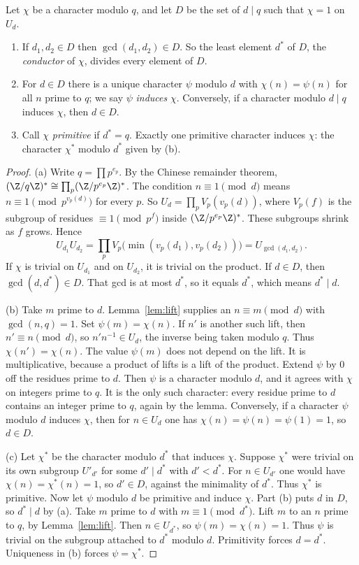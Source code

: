 \begin{proposition}\label{prop:conductor}
Let $\chi$ be a character modulo $q$, and let $D$ be the set of $d\mid q$ such that $\chi=1$ on $U_d$.
\begin{enumerate}[label=(\alph*)]
\item If $d_1,d_2\in D$ then $\gcd(d_1,d_2)\in D$. So the least element $d^*$ of $D$, the \emph{conductor} of $\chi$, divides every element of $D$.
\item For $d\in D$ there is a unique character $\psi$ modulo $d$ with $\chi(n)=\psi(n)$ for all $n$ prime to $q$; we say $\psi$ \emph{induces} $\chi$. Conversely,
if a character modulo $d\mid q$ induces $\chi$, then $d\in D$.
\item Call $\chi$ \emph{primitive} if $d^*=q$. Exactly one primitive character induces $\chi$: the character $\chi^*$ modulo $d^*$ given by (b).
\end{enumerate}
\end{proposition}
\begin{proof}
(a) Write $q=\prod p^{e_p}$. By the Chinese remainder theorem, $(\Z/q\Z)^*\cong\prod_p(\Z/p^{e_p}\Z)^*$. The condition $n\equiv1\pmod d$ means $n\equiv1\pmod{p^{v_p(d)}}$ for every $p$. So $U_d=\prod_p V_p(v_p(d))$, where $V_p(f)$ is the subgroup of residues $\equiv1\pmod{p^f}$ inside $(\Z/p^{e_p}\Z)^*$. These subgroups shrink as $f$ grows. Hence
\[
U_{d_1}U_{d_2}=\prod_p V_p\bigl(\min(v_p(d_1),v_p(d_2))\bigr)=U_{\gcd(d_1,d_2)}.
\]
If $\chi$ is trivial on $U_{d_1}$ and on $U_{d_2}$, it is trivial on the product. If $d\in D$, then $\gcd(d,d^*)\in D$. That gcd is at most $d^*$, so it equals $d^*$, which means $d^*\mid d$.

(b) Take $m$ prime to $d$. Lemma~\ref{lem:lift} supplies an $n\equiv m\pmod d$ with $\gcd(n,q)=1$. Set $\psi(m)=\chi(n)$. If $n'$ is another such lift, then $n'\equiv n\pmod d$, so $n'n^{-1}\in U_d$, the inverse being taken modulo $q$. Thus $\chi(n')=\chi(n)$. The value $\psi(m)$ does not depend on the lift. It is multiplicative, because a product of lifts is a lift of the product. Extend $\psi$ by $0$ off the residues prime to $d$. Then $\psi$ is a character modulo $d$, and it agrees with $\chi$ on integers prime to $q$. It is the only such character: every residue prime to $d$ contains an integer prime to $q$, again by the lemma. Conversely, if a character $\psi$ modulo $d$ induces $\chi$, then for $n\in U_d$ one has $\chi(n)=\psi(n)=\psi(1)=1$, so $d\in D$.

(c) Let $\chi^*$ be the character modulo $d^*$ that induces $\chi$. Suppose $\chi^*$ were trivial on its own subgroup $U'_{d'}$ for some $d'\mid d^*$ with $d'<d^*$. For $n\in U_{d'}$ one would have $\chi(n)=\chi^*(n)=1$, so $d'\in D$, against the minimality of $d^*$. Thus $\chi^*$ is primitive. Now let $\psi$ modulo $d$ be primitive and induce $\chi$. Part (b) puts $d$ in $D$, so $d^*\mid d$ by (a). Take $m$ prime to $d$ with $m\equiv1\pmod{d^*}$. Lift $m$ to an $n$ prime to $q$, by Lemma~\ref{lem:lift}. Then $n\in U_{d^*}$, so $\psi(m)=\chi(n)=1$. Thus $\psi$ is trivial on the subgroup attached to $d^*$ modulo $d$. Primitivity forces $d=d^*$. Uniqueness in (b) forces $\psi=\chi^*$.
\end{proof}

